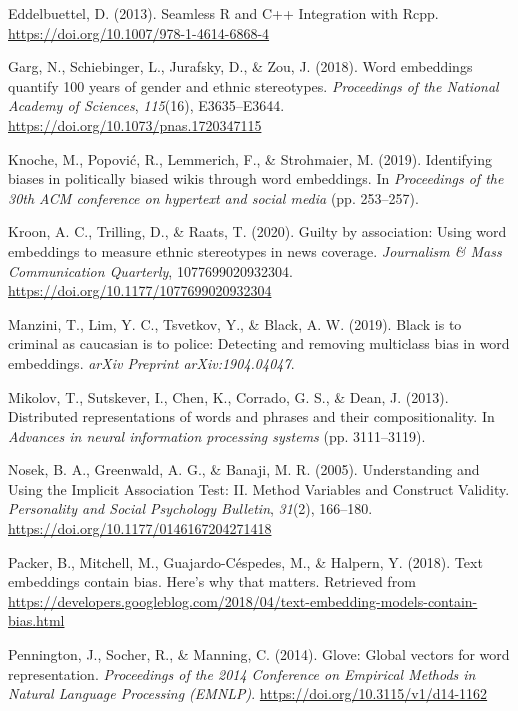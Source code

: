 \documentclass[english,man,mask]{apa6}
\begin{document}
\leavevmode\hypertarget{ref-eddelbuettel:2013:SRC}{}%
Eddelbuettel, D. (2013). Seamless R and C++ Integration with Rcpp. \url{https://doi.org/10.1007/978-1-4614-6868-4}

\leavevmode\hypertarget{ref-garg:2018:W}{}%
Garg, N., Schiebinger, L., Jurafsky, D., \& Zou, J. (2018). Word embeddings quantify 100 years of gender and ethnic stereotypes. \emph{Proceedings of the National Academy of Sciences}, \emph{115}(16), E3635--E3644. \url{https://doi.org/10.1073/pnas.1720347115}

\leavevmode\hypertarget{ref-knoche2019identifying}{}%
Knoche, M., Popović, R., Lemmerich, F., \& Strohmaier, M. (2019). Identifying biases in politically biased wikis through word embeddings. In \emph{Proceedings of the 30th ACM conference on hypertext and social media} (pp. 253--257).

\leavevmode\hypertarget{ref-kroon2020guilty}{}%
Kroon, A. C., Trilling, D., \& Raats, T. (2020). Guilty by association: Using word embeddings to measure ethnic stereotypes in news coverage. \emph{Journalism \& Mass Communication Quarterly}, 1077699020932304. \url{https://doi.org/10.1177/1077699020932304}

\leavevmode\hypertarget{ref-manzini2019black}{}%
Manzini, T., Lim, Y. C., Tsvetkov, Y., \& Black, A. W. (2019). Black is to criminal as caucasian is to police: Detecting and removing multiclass bias in word embeddings. \emph{arXiv Preprint arXiv:1904.04047}.

\leavevmode\hypertarget{ref-mikolov2013distributed}{}%
Mikolov, T., Sutskever, I., Chen, K., Corrado, G. S., \& Dean, J. (2013). Distributed representations of words and phrases and their compositionality. In \emph{Advances in neural information processing systems} (pp. 3111--3119).

\leavevmode\hypertarget{ref-nosek:2005:UUI}{}%
Nosek, B. A., Greenwald, A. G., \& Banaji, M. R. (2005). Understanding and Using the Implicit Association Test: II. Method Variables and Construct Validity. \emph{Personality and Social Psychology Bulletin}, \emph{31}(2), 166--180. \url{https://doi.org/10.1177/0146167204271418}

\leavevmode\hypertarget{ref-packer2018text}{}%
Packer, B., Mitchell, M., Guajardo-Céspedes, M., \& Halpern, Y. (2018). Text embeddings contain bias. Here's why that matters. Retrieved from \url{https://developers.googleblog.com/2018/04/text-embedding-models-contain-bias.html}

\leavevmode\hypertarget{ref-pennington:2014:G}{}%
Pennington, J., Socher, R., \& Manning, C. (2014). Glove: Global vectors for word representation. \emph{Proceedings of the 2014 Conference on Empirical Methods in Natural Language Processing (EMNLP)}. \url{https://doi.org/10.3115/v1/d14-1162}
\end{document}
